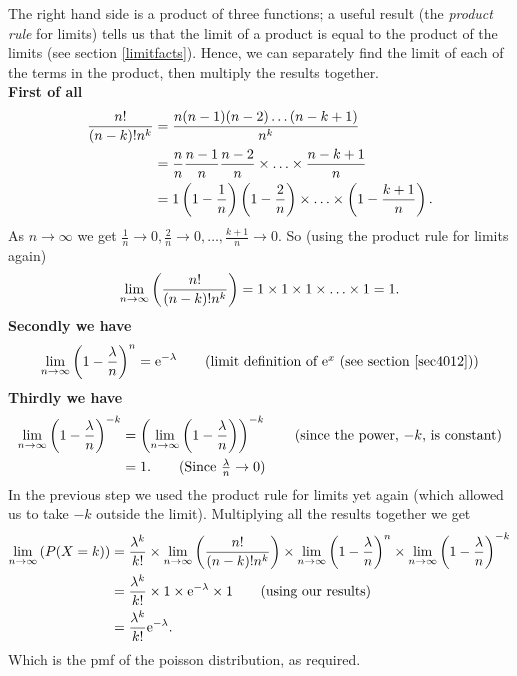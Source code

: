 The right hand side is a product of three functions; a useful result (the \textit{product rule} for limits) tells us that the limit of a product is equal to the product of the limits (see section \ref{limitfacts}). Hence, we can separately find the limit of each of the terms in the product, then multiply the results together. \\
\textbf{First of all}
\begin{align*}
\frac{n!}{(n-k)!n^k} & =  \frac{n(n-1)(n-2)\ldots(n-k+1)}{n^k} \\
	& = \frac{n}{n}\frac{n-1}{n}\frac{n-2}{n}\times\ldots\times\frac{n-k+1}{n} \\
	& = 1\left(1-\frac{1}{n}\right)\left(1-\frac{2}{n}\right)\times\ldots\times\left(1-\frac{k+1}{n}\right).
\end{align*}
As $n \rightarrow \infty$ we get $\frac{1}{n} \rightarrow 0, \frac{2}{n} \rightarrow 0, \ldots, \frac{k+1}{n} \rightarrow 0$. So (using the product rule for limits again)
\[
\lim_{n \rightarrow \infty}\left(\frac{n!}{(n-k)!n^k}\right) = 1\times1\times1\times \ldots\times 1 = 1.
\]
\textbf{Secondly we have}
\[
\lim_{n\rightarrow \infty}\brac{1-\frac{\lambda}{n}}^n = \e^{-\lambda} \tag{limit definition of $\e^x$ (see section \ref{sec4012})}
\]
\textbf{Thirdly we have}
\begin{align*}
\lim_{n \rightarrow \infty}\brac{1-\frac{\lambda}{n}}^{-k} & = \brac{\lim_{n \rightarrow \infty}\brac{1-\frac{\lambda}{n}}}^{-k} \tag{since the power, $-k$, is constant} \\
& = 1. \tag{Since $\frac{\lambda}{n} \rightarrow 0$}
\end{align*}
In the previous step we used the product rule for limits yet again (which allowed us to take $-k$ outside the limit).
Multiplying all the results together we get
\begin{align*}
\lim_{n \rightarrow \infty}\left(P(X = k)\right) & = \frac{\lambda^k}{k!} \times \lim_{n \rightarrow \infty}\left(\frac{n!}{(n-k)!n^k}\right) \times \lim_{n \rightarrow \infty}\left(1-\frac{\lambda}{n}\right)^n \times \lim_{n \rightarrow \infty}\left(1-\frac{\lambda}{n}\right)^{-k} \\
	& = \frac{\lambda^k}{k!} \times 1 \times \mathrm{e}^{-\lambda} \times 1 \tag{using our results} \\
	& =  \frac{\lambda^k}{k!} \mathrm{e}^{-\lambda}.
\end{align*}
Which is the pmf of the poisson distribution, as required.